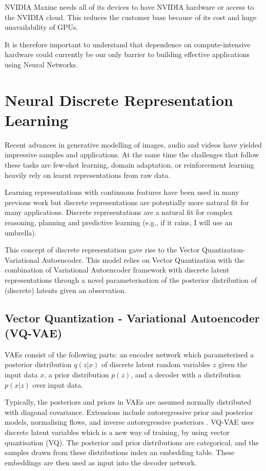 NVIDIA Maxine needs all of its devices to have NVIDIA hardware or access to the NVIDIA cloud. 
This reduces the customer base because of its cost and huge unavailability of GPUs.

It is therefore important to understand that dependence on compute-intensive hardware could
currently be our only barrier to building effective applications using Neural Networks.

\section{Neural Discrete Representation Learning}

Recent advances in generative modelling of images, audio and videos have yielded impressive
samples and applications. At the same time the challenges that follow these tasks are few-shot
learning, domain adaptation, or reinforcement learning heavily rely on learnt representations from raw data.

Learning representations with continuous features have been used in many previous 
work but discrete representations  are potentially more natural fit for many applications. 
Discrete representations are a natural fit for complex reasoning, planning and predictive learning
(e.g., if it rains, I will use an umbrella).

This concept of discrete representation gave rise to the Vector Quantization-Variational Autoencoder. 
This model relies on Vector Quantization with the combination of Variational Autoencoder framework with 
discrete latent representations through a novel parameterisation of the posterior distribution of (discrete) 
latents given an observation.~\cite{oord2018neural}

\subsection{Vector Quantization - Variational Autoencoder (VQ-VAE)}

VAEs consist of the following parts: an encoder network which parameterised a posterior  
distribution $q(z|x)$ of discrete latent random variables $z$ given the input data $x$, a prior
distribution $p(z)$, and a decoder with a distribution $p(x|z)$ over input data.

Typically, the posteriors and priors in VAEs are assumed normally distributed with diagonal 
covariance. Extensions include autoregressive prior and posterior models, normalising flows, 
and inverse autoregressive posteriors . VQ-VAE uses discrete latent variables which is  
a new way of training, by using vector quantisation (VQ). The posterior and prior distributions are 
categorical, and the samples drawn from these distributions index an embedding table. These embeddings
are then used as input into the decoder network.

